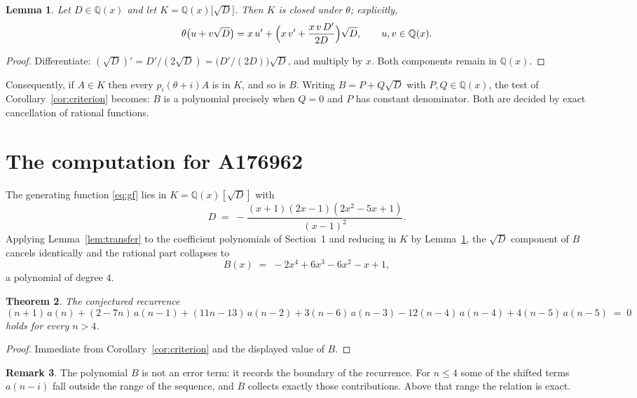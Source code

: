 \documentclass[11pt,a4paper]{article}
\theoremstyle{plain}
\newtheorem{theorem}{Theorem}
\newtheorem{lemma}[theorem]{Lemma}
\theoremstyle{definition}
\newtheorem{remark}[theorem]{Remark}
\begin{document}
\begin{lemma}\label{lem:field}
Let $D\in\mathbb{Q}(x)$ and let $K=\mathbb{Q}(x)\bigl[\sqrt{D}\bigr]$. Then $K$ is closed
under $\theta$; explicitly,
\[
\theta\bigl(u+v\sqrt{D}\bigr)=x\,u'+\Bigl(x\,v'+\frac{x\,v\,D'}{2D}\Bigr)\sqrt{D},
\qquad u,v\in\mathbb{Q}(x).
\]
\end{lemma}

\begin{proof}
Differentiate: $(\sqrt{D})'=D'/(2\sqrt{D})=\bigl(D'/(2D)\bigr)\sqrt{D}$, and multiply by
$x$. Both components remain in $\mathbb{Q}(x)$.
\end{proof}

Consequently, if $A\in K$ then every $p_{i}(\theta+i)A$ is in $K$, and so is $B$. Writing
$B=P+Q\sqrt{D}$ with $P,Q\in\mathbb{Q}(x)$, the test of Corollary~\ref{cor:criterion}
becomes: $B$ is a polynomial precisely when $Q=0$ and $P$ has constant denominator. Both
are decided by exact cancellation of rational functions.

\section{The computation for A176962}

The generating function \eqref{eq:gf} lies in $K=\mathbb{Q}(x)[\sqrt{D}]$ with
\[
D \;=\; - \frac{\left(x + 1\right) \left(2 x - 1\right) \left(2 x^{2} - 5 x + 1\right)}{\left(x - 1\right)^{2}} .
\]
Applying Lemma~\ref{lem:transfer} to the coefficient polynomials of Section~1 and reducing
in $K$ by Lemma~\ref{lem:field}, the $\sqrt{D}$ component of $B$ cancels identically and
the rational part collapses to
\[
B(x)\;=\;- 2 x^{4} + 6 x^{3} - 6 x^{2} - x + 1 ,
\]
a polynomial of degree $4$.

\begin{theorem}
The conjectured recurrence
\[
(n + 1)\,a(n) + (2 - 7 n)\,a(n-1) + (11 n - 13)\,a(n-2) + 3 \left(n - 6\right)\,a(n-3) -  12 \left(n - 4\right)\,a(n-4) + 4 \left(n - 5\right)\,a(n-5) \;=\;0
\]
holds for every $n>4$.
\end{theorem}

\begin{proof}
Immediate from Corollary~\ref{cor:criterion} and the displayed value of $B$.
\end{proof}

\begin{remark}
The polynomial $B$ is not an error term: it records the boundary of the recurrence. For
$n\le4$ some of the shifted terms $a(n-i)$ fall outside the range of the sequence,
and $B$ collects exactly those contributions. Above that range the relation is exact.
\end{remark}
\end{document}
